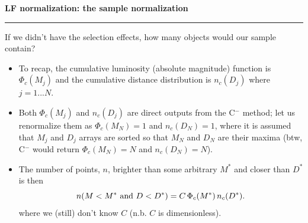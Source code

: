 \documentclass[letterpaper,landscape]{slides}
\begin{document}
\begin{slide}
\begin{center}
\bfseries
{\large {\color{red} LF normalization: the sample normalization}}
\end{center}
\vskip 0.2in
\hrule
{\color{blue} If we didn't have the selection effects, how many 
  objects would our sample contain?} 
\begin{itemize}
\item  To recap, the cumulative luminosity (absolute magnitude) function is 
$\Phi_c(M_j)$ and the cumulative distance distribution is $n_c(D_j)$ where
$j=1...N$.
\item Both $\Phi_c(M_j)$ and $n_c(D_j)$ are  {\color{blue} direct outputs} from the C$^-$ method;
{\color{blue} let us renormalize them} as $\Phi_c(M_N)=1$ and  $n_c(D_N)=1$,
where it is assumed that $M_j$ and $D_j$ arrays are sorted so that $M_N$ and 
$D_N$ are their maxima (btw, C$^-$ would return $\Phi_c(M_N)=N$ and  $n_c(D_N)=N$). 
\item The number of points, $n$,  brighter than some arbitrary $M^\ast$ and closer than $D^\ast$ is then
\begin{equation}
          n(M<M^\ast \,\, {\rm and} \,\,  D<D^\ast)= C \, \Phi_c(M^\ast) \, n_c(D^\ast).
\end{equation}
where we (still) don't know $C$ (n.b. $C$ is dimensionless). 
\end{itemize}

\vfill
\end{slide}
 
\end{document}
